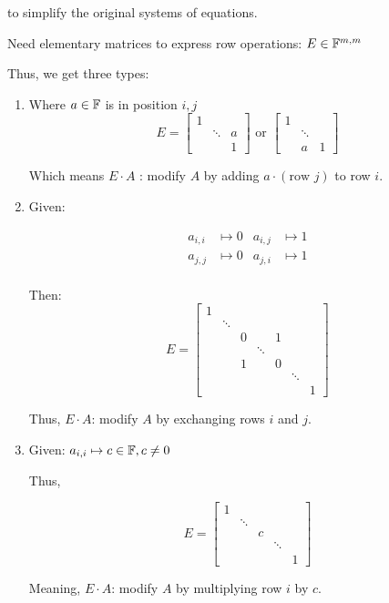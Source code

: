 {to simplify the original systems of equations.

Need elementary matrices to express row operations: \(E \in \FF^{m, m}\)

Thus, we get three types:

\begin{enumerate}[label=(\roman*)]
	\item Where \(a \in \FF\) is in position \(i,j\)
	      \[
		      E = \begin{bmatrix} 1 & & \\ & \ddots & a \\ & & 1 \end{bmatrix} \text{ or } \begin{bmatrix} 1 & & \\ & \ddots & \\ & a & 1 \end{bmatrix}
	      \]

	      Which means \(E \cdot A\) : modify \(A\) by adding \(a \cdot \left( \text{row } j\right) \) to row \(i\).
	\item

	      Given:

	      \begin{align*}
		      a_{i,i} & \mapsto 0 & a_{i,j} & \mapsto 1 \\
		      a_{j,j} & \mapsto 0 & a_{j,i} & \mapsto 1 \\
	      \end{align*}

	      Then:
	      \[
		      E = \begin{bmatrix} 1 & & & & & & \\ & \ddots & & & & & \\ & & 0 & & 1 & & \\ & & & \ddots & & & \\ & & 1 & & 0 & & \\ & & & & & \ddots & \\ & & & & & & 1 \end{bmatrix}
	      \]

	      Thus, \(E \cdot A\): modify \(A\) by exchanging rows \(i\) and \(j\).

	\item Given: \(a_{i,i} \mapsto c \in \FF, c \neq 0\)

	      Thus,

	      \[
		      E = \begin{bmatrix} 1 & & & & \\ & \ddots & & & \\ & & c & & \\ & & & \ddots & \\ & & & & 1 \end{bmatrix}
	      \]

	      Meaning, \(E \cdot A\): modify \(A\) by multiplying row \(i\) by \(c\).
\end{enumerate}
}


